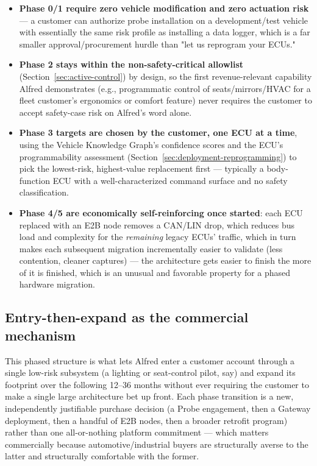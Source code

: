\begin{itemize}
\item \textbf{Phase 0/1 require zero vehicle modification and zero actuation risk} --- a customer can authorize probe installation on a development/test vehicle with essentially the same risk profile as installing a data logger, which is a far smaller approval/procurement hurdle than "let us reprogram your ECUs."
\item \textbf{Phase 2 stays within the non-safety-critical allowlist} (Section~\ref{sec:active-control}) by design, so the first revenue-relevant capability Alfred demonstrates (e.g., programmatic control of seats/mirrors/HVAC for a fleet customer's ergonomics or comfort feature) never requires the customer to accept safety-case risk on Alfred's word alone.
\item \textbf{Phase 3 targets are chosen by the customer, one ECU at a time}, using the Vehicle Knowledge Graph's confidence scores and the ECU's programmability assessment (Section~\ref{sec:deployment-reprogramming}) to pick the lowest-risk, highest-value replacement first --- typically a body-function ECU with a well-characterized command surface and no safety classification.
\item \textbf{Phase 4/5 are economically self-reinforcing once started}: each ECU replaced with an E2B node removes a CAN/LIN drop, which reduces bus load and complexity for the \emph{remaining} legacy ECUs' traffic, which in turn makes each subsequent migration incrementally easier to validate (less contention, cleaner captures) --- the architecture gets easier to finish the more of it is finished, which is an unusual and favorable property for a phased hardware migration.
\end{itemize}

\subsection{Entry-then-expand as the commercial mechanism}

This phased structure is what lets Alfred enter a customer account through a single low-risk subsystem (a lighting or seat-control pilot, say) and expand its footprint over the following 12--36 months without ever requiring the customer to make a single large architecture bet up front. Each phase transition is a new, independently justifiable purchase decision (a Probe engagement, then a Gateway deployment, then a handful of E2B nodes, then a broader retrofit program) rather than one all-or-nothing platform commitment --- which matters commercially because automotive/industrial buyers are structurally averse to the latter and structurally comfortable with the former.
